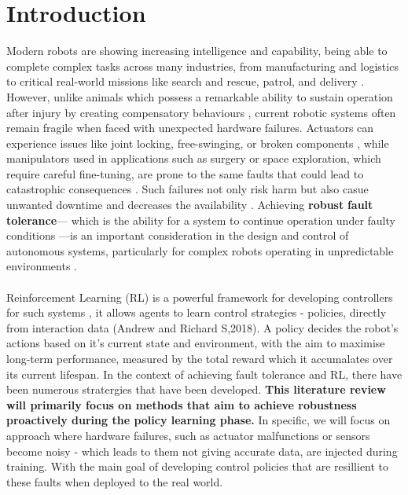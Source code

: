 \documentclass[12pt, a4paper]{article} %
\begin{document}
\section{Introduction}
\label{sec:introduction} %
\noindent
Modern robots are showing increasing intelligence and capability, being able to complete complex tasks across many industries, from manufacturing and logistics to critical real-world missions like search and rescue, patrol, and delivery \citep{liu2023saving}.
However, unlike animals which possess a remarkable ability to sustain operation after injury by creating compensatory behaviours \citep{bongard2006resilient}, current robotic systems often remain fragile when faced with unexpected hardware failures.
Actuators can experience issues like joint locking, free-swinging, or broken components \citep{liu2023saving}, while manipulators used in applications such as surgery or space exploration, which require careful fine-tuning, are prone to the same faults that could lead to catastrophic consequences \citep{pham2024adaptive}.
Such failures not only risk harm but also casue unwanted downtime and decreases the availability \citep{liu2023saving}.
Achieving \textbf{robust} \textbf{fault tolerance}— which is the ability for a system to continue operation under faulty conditions \citep{blanke1997, ahmed2020fault}—is an important consideration in the design and control of autonomous systems, particularly for complex robots operating in unpredictable environments \citep{liu2023saving}. \\\\
Reinforcement Learning (RL) is a powerful framework for developing controllers for such systems , it allows agents to learn control strategies - policies, directly from interaction data (Andrew and Richard S,2018). A policy decides the robot's actions based on it's current state and environment, with the aim to maximise long-term performance, measured by the total reward which it accumalates over its current lifespan. In the context of achieving fault tolerance and RL, there have been numerous stratergies that have been developed. \textbf{This literature review will primarily focus on methods that aim to achieve robustness proactively during the policy learning phase.}
In specific, we will focus on approach where hardware failures, such as actuator malfunctions or sensors become noisy - which leads to them not giving accurate data, are injected during training. With the main goal of developing control policies that are resillient to these faults when deployed to the real world.
\end{document}
